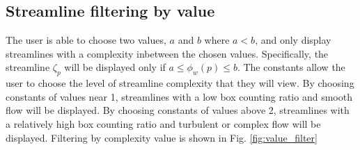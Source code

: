 \documentclass{egpubl}
\begin{document}
\subsection{Streamline filtering by value}
The user is able to choose two values, $a$ and $b$ where $a < b$, and only display streamlines with a complexity inbetween the chosen values. 
Specifically, the streamline $\zeta_p$ will be displayed only if $a \leq \phi_w(p) \leq b$.
The constants allow the user to choose the level of streamline complexity that they will view.
By choosing constants of values near 1, streamlines with a low box counting ratio and smooth flow will be displayed.
By choosing constants of values above 2, streamlines with a relatively high box counting ratio and turbulent or complex flow will be displayed.
Filtering by complexity value is shown in Fig. \ref{fig:value_filter}
\end{document}
